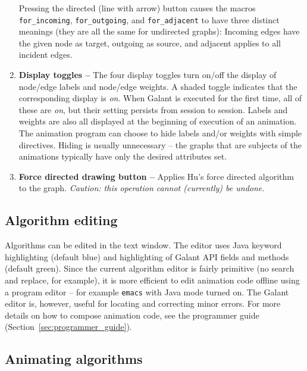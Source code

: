 \begin{enumerate}
Pressing the directed (line with arrow) button causes the macros
\texttt{for\_incoming}, \texttt{for\_outgoing}, and \texttt{for\_adjacent}
to have three distinct meanings (they are all the same for undirected graphs):
Incoming edges have the given node as target, outgoing as source, and adjacent applies to all incident edges.

\item
\textbf{Display toggles --}
The four display toggles turn on/off the display of node/edge labels and node/edge weights.
A shaded toggle indicates that the corresponding display is \emph{on}.
When Galant is executed for the first time, all of these are \emph{on},
but their setting persists from session to session.
Labels and weights are also all displayed at the beginning of execution of
an animation.
The animation program can choose to hide labels and/or weights with simple
directives.
Hiding is usually unnecessary -- the graphs that are subjects of the animations
typically have only the desired attributes set.

\item
\textbf{Force directed drawing button -- }
Applies Hu's force directed algorithm~\cite{2006-Mathematica-Hu} to the graph.
\emph{Caution: this operation cannot (currently) be undone.}

\end{enumerate}

\subsection{Algorithm editing}
\label{sec:algorithm_editing}

Algorithms can be edited in the text window. The
editor uses Java keyword highlighting (default blue) and
highlighting of Galant API fields and methods (default green).
Since the current algorithm editor is fairly primitive (no search and replace, for example),
it is more efficient to edit animation code offline using a program editor --
for example \texttt{emacs} with Java mode turned on.
The Galant editor is, however, useful for locating and correcting minor errors.
For more details on how to compose animation code, see the programmer guide
(Section~\ref{sec:programmer_guide}).

\subsection{Animating algorithms}
\label{sec:animating_algorithms}


